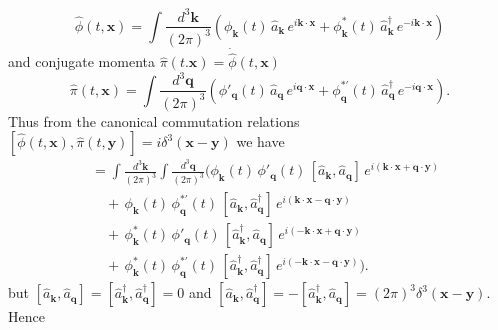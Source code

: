 \begin{equation*}
    \hat{\phi}(t,\mathbf{x}) = \int \frac{d^3 \mathbf{k}}{(2\pi)^3}
    \left( \phi_{\mathbf{k}}(t)\,\hat{a}_{\mathbf{k}}\, e^{i \mathbf{k}\cdot \mathbf{x}} + \phi_{\mathbf{k}}^*(t)\,\hat{a}_{\mathbf{k}}^\dagger\, e^{-i \mathbf{k}\cdot \mathbf{x}}
    \right)
\end{equation*}
and conjugate momenta $\hat{\pi} (t. \bm{x}) = \dot{\hat{\phi}}(t,\bm{x})$
\begin{equation*}
    \hat{\pi}(t,\mathbf{x}) = \int \frac{d^3 \mathbf{q}}{(2\pi)^3}
    \left( \phi'_{\mathbf{q}}(t)\,\hat{a}_{\mathbf{q}}\, e^{i \mathbf{q}\cdot \mathbf{x}} + \phi_{\mathbf{q}}^{*\prime}(t)\,\hat{a}_{\mathbf{q}}^\dagger\, e^{-i \mathbf{q}\cdot \mathbf{x}}
    \right).
\end{equation*}
Thus from the canonical commutation relations $[\hat{\phi}(t, \bm{x}), \hat{\pi}(t, \bm{y})] = i \delta^{3}(\bm{x} - \bm{y})$ we have
\begin{align*}
[\hat{\phi}(t,\mathbf{x}), \hat{\pi}(t,\mathbf{y})]
&=
\int \frac{d^3 \mathbf{k}}{(2\pi)^3}
\int \frac{d^3 \mathbf{q}}{(2\pi)^3}
\Big(
\phi_{\mathbf{k}}(t)\,\phi'_{\mathbf{q}}(t)\,
[\hat{a}_{\mathbf{k}}, \hat{a}_{\mathbf{q}}]\,
e^{i(\mathbf{k}\cdot\mathbf{x} + \mathbf{q}\cdot\mathbf{y})}\\
&\quad
+\, \phi_{\mathbf{k}}(t)\,\phi_{\mathbf{q}}^{*\prime}(t)\,
[\hat{a}_{\mathbf{k}}, \hat{a}_{\mathbf{q}}^\dagger]\,
e^{i(\mathbf{k}\cdot\mathbf{x} - \mathbf{q}\cdot\mathbf{y})}\\
&\quad
+\, \phi_{\mathbf{k}}^*(t)\,\phi'_{\mathbf{q}}(t)\,
[\hat{a}_{\mathbf{k}}^\dagger, \hat{a}_{\mathbf{q}}]\,
e^{i(-\mathbf{k}\cdot\mathbf{x} + \mathbf{q}\cdot\mathbf{y})}\\
&\quad
+\, \phi_{\mathbf{k}}^*(t)\,\phi_{\mathbf{q}}^{*\prime}(t)\,
[\hat{a}_{\mathbf{k}}^\dagger, \hat{a}_{\mathbf{q}}^\dagger]\,
e^{i(-\mathbf{k}\cdot\mathbf{x} - \mathbf{q}\cdot\mathbf{y})}
\Big).
\end{align*}
but $[\hat{a}_{\mathbf{k}}, \hat{a}_{\mathbf{q}}] = [\hat{a}_{\mathbf{k}}^\dagger, \hat{a}_{\mathbf{q}}^\dagger] = 0$ and $[\hat{a}_{\mathbf{k}}, \hat{a}_{\mathbf{q}}^\dagger] = -[\hat{a}_{\mathbf{k}}^\dagger, \hat{a}_{\mathbf{q}}] = (2 \pi)^3 \delta^3(\bm{x} - \bm{y})$. Hence

